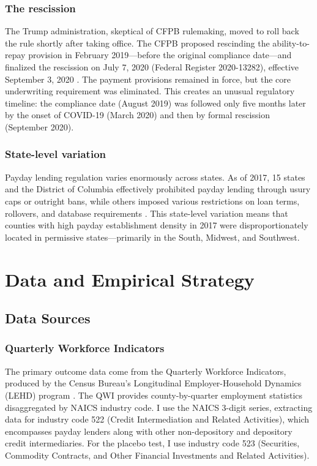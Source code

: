 \documentclass[12pt]{article}
\begin{document}
\subsubsection*{The rescission} The Trump administration, skeptical of CFPB rulemaking, moved to roll back the rule shortly after taking office. The CFPB proposed rescinding the ability-to-repay provision in February 2019---before the original compliance date---and finalized the rescission on July 7, 2020 (Federal Register 2020-13282), effective September 3, 2020 \citep{cfpb2020}. The payment provisions remained in force, but the core underwriting requirement was eliminated. This creates an unusual regulatory timeline: the compliance date (August 2019) was followed only five months later by the onset of COVID-19 (March 2020) and then by formal rescission (September 2020).

\subsubsection*{State-level variation} Payday lending regulation varies enormously across states. As of 2017, 15 states and the District of Columbia effectively prohibited payday lending through usury caps or outright bans, while others imposed various restrictions on loan terms, rollovers, and database requirements \citep{bhutta2015}. This state-level variation means that counties with high payday establishment density in 2017 were disproportionately located in permissive states---primarily in the South, Midwest, and Southwest.


\section{Data and Empirical Strategy}

\subsection{Data Sources}

\subsubsection*{Quarterly Workforce Indicators} The primary outcome data come from the Quarterly Workforce Indicators, produced by the Census Bureau's Longitudinal Employer-Household Dynamics (LEHD) program \citep{abowd2009}. The QWI provides county-by-quarter employment statistics disaggregated by NAICS industry code. I use the NAICS 3-digit series, extracting data for industry code 522 (Credit Intermediation and Related Activities), which encompasses payday lenders along with other non-depository and depository credit intermediaries. For the placebo test, I use industry code 523 (Securities, Commodity Contracts, and Other Financial Investments and Related Activities).
\end{document}
